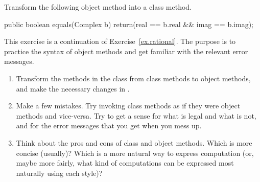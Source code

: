 \begin{exercise}
Transform the following object method into a class method.

\begin{code}
public boolean equals(Complex b) {
    return(real == b.real && imag == b.imag);
}
\end{code}
\end{exercise}


\begin{exercise}

This exercise is a continuation of Exercise~\ref{ex.rational}.
The purpose is to practice the syntax of object methods and get familiar with the relevant error messages.

\begin{enumerate}

\item Transform the methods in the  class from class methods to object methods, and make the necessary changes in .

\item Make a few mistakes.
Try invoking class methods as if they were object methods and vice-versa.
Try to get a sense for what is legal and what is not, and for the error messages that you get when you mess up.

\item Think about the pros and cons of class and object methods.
Which is more concise (usually)?
Which is a more natural way to express computation (or, maybe more fairly, what kind of computations can be expressed most naturally using each style)?

\end{enumerate}
\end{exercise}


